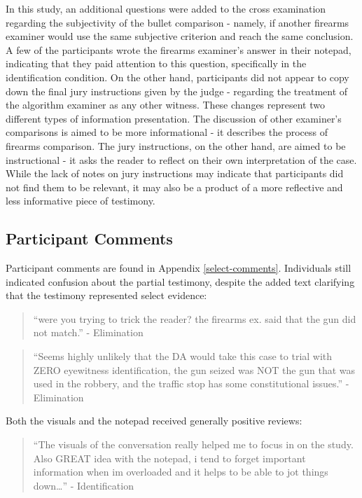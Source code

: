 \documentclass[print]{nuthesis}
\begin{document}
In this study, an additional questions were added to the cross examination regarding the subjectivity of the bullet comparison - namely, if another firearms examiner would use the same subjective criterion and reach the same conclusion.
A few of the participants wrote the firearms examiner's answer in their notepad, indicating that they paid attention to this question, specifically in the identification condition.
On the other hand, participants did not appear to copy down the final jury instructions given by the judge - regarding the treatment of the algorithm examiner as any other witness.
These changes represent two different types of information presentation.
The discussion of other examiner's comparisons is aimed to be more informational - it describes the process of firearms comparison.
The jury instructions, on the other hand, are aimed to be instructional - it asks the reader to reflect on their own interpretation of the case.
While the lack of notes on jury instructions may indicate that participants did not find them to be relevant, it may also be a product of a more reflective and less informative piece of testimony.

\hypertarget{participant-comments}{%
\subsection{Participant Comments}\label{participant-comments}}

Participant comments are found in Appendix \ref{select-comments}.
Individuals still indicated confusion about the partial testimony, despite the added text clarifying that the testimony represented select evidence:

\begin{quote}
``were you trying to trick the reader? the firearms ex. said that the gun did not match.'' - Elimination
\end{quote}

\begin{quote}
``Seems highly unlikely that the DA would take this case to trial with ZERO eyewitness identification, the gun seized was NOT the gun that was used in the robbery, and the traffic stop has some constitutional issues.'' - Elimination
\end{quote}

Both the visuals and the notepad received generally positive reviews:

\begin{quote}
``The visuals of the conversation really helped me to focus in on the study. Also GREAT idea with the notepad, i tend to forget important information when im overloaded and it helps to be able to jot things down\ldots{}'' - Identification
\end{quote}
\end{document}
